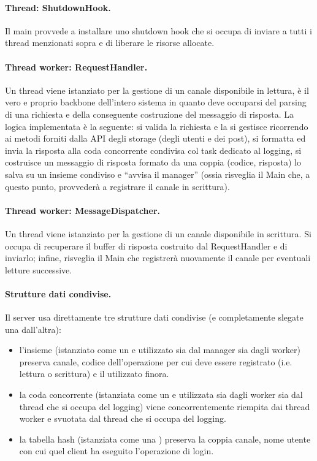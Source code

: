 \documentclass[11pt, italian, openany]{book}
\begin{document}
\begin{sloppypar}
\paragraph*{Thread: ShutdownHook.}
Il main provvede a installare uno shutdown hook che si occupa di inviare  a tutti i thread menzionati sopra e di
liberare le risorse allocate.

\paragraph*{Thread worker: RequestHandler.}
Un thread  viene istanziato per la gestione di un canale disponibile in lettura,
\`e il vero e proprio backbone dell'intero sistema in quanto deve occuparsi del parsing di una richiesta e della conseguente costruzione
del messaggio di risposta. La logica implementata \`e la seguente: si valida la richiesta e la si gestisce ricorrendo ai metodi
forniti dalla API degli storage (degli utenti e dei post), si formatta ed invia la risposta alla coda concorrente condivisa col task
dedicato al logging, si costruisce un messaggio di risposta formato da una coppia (codice, risposta) lo salva su un insieme condiviso
e ``avvisa il manager'' (ossia risveglia il Main che, a questo punto, provveder\`a a registrare il canale in scrittura).

\paragraph*{Thread worker: MessageDispatcher.}
Un thread  viene istanziato per la gestione di un canale disponibile in
scrittura. Si occupa di recuperare il buffer di risposta costruito dal RequestHandler e di inviarlo; infine, risveglia il Main che
registrer\`a nuovamente il canale per eventuali letture successive.

\paragraph*{Strutture dati condivise.}
Il server usa direttamente tre strutture dati condivise (e completamente slegate una dall'altra):
\begin{itemize}[topsep=0pt, itemsep=0pt, parsep=0pt]
	\item l'insieme  (istanziato come un
	 e utilizzato sia dal manager sia dagli worker) preserva canale, codice dell'operazione per cui
	deve essere registrato (i.e. lettura o scrittura) e il  utilizzato finora.
	\item la coda concorrente  (istanziata come un  e utilizzata sia dagli worker sia dal
	thread che si occupa del logging) viene concorrentemente riempita dai thread worker e svuotata dal thread che si occupa del logging.
	\item la tabella hash  (istanziata come una ) preserva la coppia canale, nome utente
	con cui quel client ha eseguito l'operazione di login.
\end{itemize}


\end{sloppypar}
\end{document}
